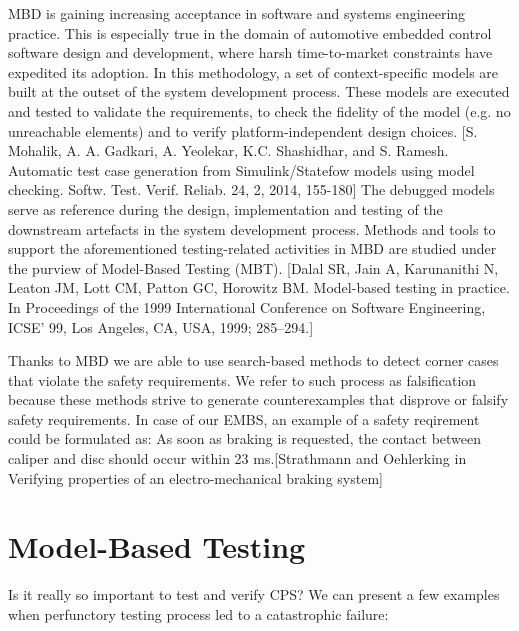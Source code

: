 MBD is gaining increasing acceptance in software and systems engineering practice. This is especially true in the domain of automotive embedded control software design and development, where harsh time-to-market constraints have expedited its adoption. In this methodology, a set of context-specific models are built at the outset of the system development process. These models are executed and tested to validate the requirements, to check the fidelity of the model (e.g. no unreachable elements) and to verify platform-independent design choices. [S. Mohalik, A. A. Gadkari, A. Yeolekar, K.C. Shashidhar, and S. Ramesh. Automatic test case generation from Simulink/Statefow models using model checking. Softw. Test. Verif. Reliab. 24, 2, 2014, 155-180] The debugged models serve as reference during the design, implementation and testing of the downstream artefacts in the system development process. Methods and tools to support the aforementioned testing-related activities in MBD are studied under the purview of Model-Based Testing (MBT). [Dalal SR, Jain A, Karunanithi N, Leaton JM, Lott CM, Patton GC, Horowitz BM. Model-based testing in practice. In Proceedings of the 1999 International Conference on Software Engineering, ICSE’ 99, Los Angeles, CA, USA, 1999; 285–294.]

Thanks to MBD we are able to use search-based methods to detect corner cases that violate the safety requirements. We refer to such process as falsification because these methods strive to generate counterexamples that disprove or falsify safety requirements. In case of our EMBS, an example of a safety reqirement could be formulated as: As soon as braking is requested, the contact between caliper and disc should occur within 23 ms.[Strathmann and Oehlerking in Verifying properties of an electro-mechanical braking system]

\section{Model-Based Testing} \label{sec:num3}

Is it really so important to test and verify CPS? We can present a few examples when perfunctory testing process led to a catastrophic failure:

